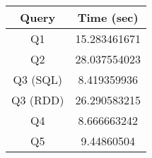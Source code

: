 \begin{tabular}{|c|c|}
\hline
Query&Time (sec) \\ 
\hline
\hline
Q1&15.283461671 \\ 
\hline
Q2&28.037554023 \\ 
\hline
Q3 (SQL)&8.419359936 \\ 
\hline
Q3 (RDD)&26.290583215 \\ 
\hline
Q4&8.666663242 \\ 
\hline
Q5&9.44860504 \\ 
\hline
\end{tabular}